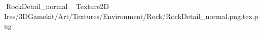    RockDetail_normal             	   Texture2D
   I   res/3DGamekit/Art/Textures/Environment/Rock/RockDetail_normal.png.tex.png